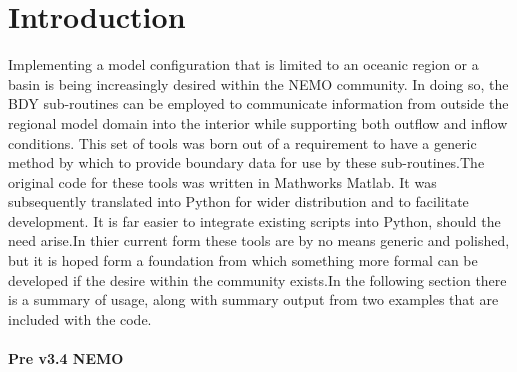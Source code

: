 

\chapter{Introduction}

Implementing a model configuration that is limited to an oceanic region or a basin
is being increasingly desired within the NEMO community. In doing so, the BDY 
sub-routines can be employed to communicate information from outside the regional
model domain into the interior while supporting both outflow and inflow conditions.
This set of tools was born out of a requirement to have a generic method by which 
to provide boundary data for use by these sub-routines.The original code for these
tools was written in Mathworks Matlab. It was subsequently translated into Python 
for wider distribution and to facilitate development. It is far easier to integrate 
existing scripts into Python, should the need arise.In thier current form these 
tools are by no means generic and polished, but it is hoped form a foundation from
which something more formal can be developed if the desire within the community 
exists.In the following section there is a summary of usage, along with summary 
output from two examples that are included with the code.


\subsubsection{Pre v3.4 NEMO}

